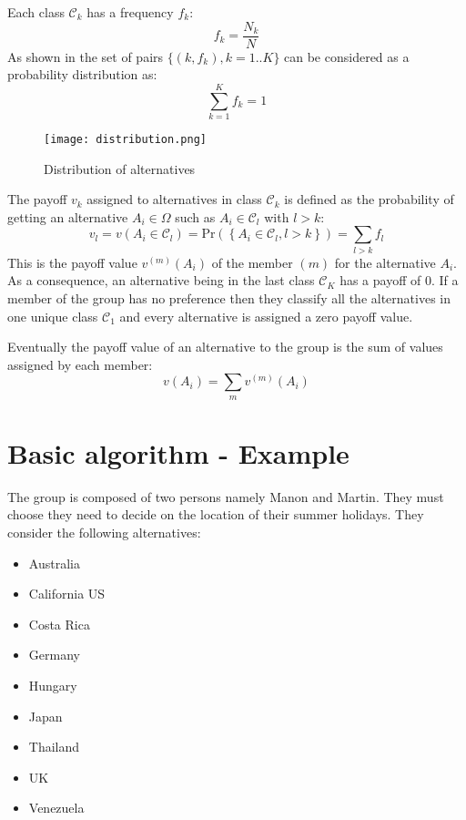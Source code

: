\documentclass[12pt,a4paper]{article}
\begin{document}
Each class $\mathcal{C}_k$ has a frequency $f_k$:
\begin{equation}
f_k = \frac{N_k}{N}
\end{equation}
As shown in the set of pairs $\{(k,f_k), k=1..K\}$ can be considered as a probability distribution as:
\begin{equation}\label{eq_sum_frequencies}
\sum_{k=1}^K{f_k} = 1
\end{equation}

\begin{figure}[h]
\centering
\texttt{[image: distribution.png]}
\caption{Distribution of alternatives}
\label{fig:distribution}
\end{figure}
The payoff $v_k$ assigned to alternatives in class $\mathcal{C}_k$ is defined as the probability of getting an alternative $A_i\in\Omega$ such as $A_i\in\mathcal{C}_l$ with $l>k$:
\begin{equation}\label{eq_member_payoff}
v_l = v\left(A_i\in\mathcal{C}_l\right)=\mathrm{Pr}\left(\left\lbrace A_i\in\mathcal{C}_l, l>k\right\rbrace\right)=\sum_{l>k}{f_l}
\end{equation}
This is the payoff value $v^{(m)}(A_i)$ of the member $(m)$ for the alternative $A_i$.
As a consequence, an alternative being in the last class $\mathcal{C}_K$ has a payoff of 0. If a member of the group has no preference then they classify all the alternatives in one unique class $\mathcal{C}_1$ and every alternative is assigned a zero payoff value.

Eventually the payoff value of an alternative to the group is the sum of values assigned by each member:
\begin{equation}\label{eq_alternatives_payoff}
v\left(A_i\right)=\sum_{m}{v^{(m)}(A_i)}
\end{equation}

\section{Basic algorithm - Example}

The group is composed of two persons namely Manon and Martin. They must choose they need to decide on the location of their summer holidays. They consider the following alternatives:
\begin{itemize}
\item Australia
\item California US
\item Costa Rica
\item Germany
\item Hungary
\item Japan
\item Thailand
\item UK
\item Venezuela
\end{itemize}
\end{document}

